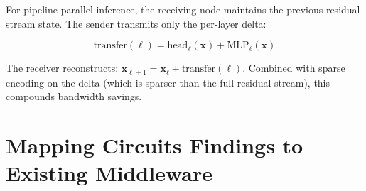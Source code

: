 \documentclass[11pt,letterpaper]{article}
\begin{document}
For pipeline-parallel inference, the receiving node maintains the previous residual stream state. The sender transmits only the per-layer delta:

\begin{equation}
    \text{transfer}(\ell) = \text{head}_\ell(\mathbf{x}) + \text{MLP}_\ell(\mathbf{x})
\end{equation}

The receiver reconstructs: $\mathbf{x}_{\ell+1} = \mathbf{x}_\ell + \text{transfer}(\ell)$. Combined with sparse encoding on the delta (which is sparser than the full residual stream), this compounds bandwidth savings.

\section{Mapping Circuits Findings to Existing Middleware}
\label{sec:mapping}
\end{document}
